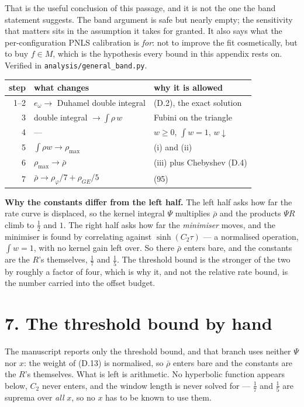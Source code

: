 \documentclass[11pt]{article}
\newcommand{\rmax}{\rho_{\max}}
\newcommand{\rbar}{\bar\rho}
\begin{document}
That is the useful conclusion of this passage, and it is not the one the
band statement suggests. The band argument is safe but nearly empty; the
sensitivity that matters sits in the assumption it takes for granted.
It also says what the per-configuration PNLS calibration is \emph{for}:
not to improve the fit cosmetically, but to buy $f \in M$, which is the
hypothesis every bound in this appendix rests on. Verified in
\texttt{analysis/general\_band.py}.

\begin{center}\small
\begin{tabular}{@{}rll@{}}
\toprule
step & what changes & why it is allowed \\
\midrule
1--2 & $e_\omega \to$ Duhamel double integral & (D.2), the exact solution \\
3 & double integral $\to \int\rho\,w$ & Fubini on the triangle \\
4 & --- & $w\ge0$, $\int w = 1$, $w\downarrow$ \\
5 & $\int\rho w \to \rmax$ & (i) and (ii) \\
6 & $\rmax \to \rbar$ & (iii) plus Chebyshev (D.4) \\
7 & $\rbar \to \rho_{\varphi}/7 + \rho_{GE}/5$ & (95) \\
\bottomrule
\end{tabular}
\end{center}


\textbf{Why the constants differ from the left half.} The left half
asks how far the rate curve is displaced, so the kernel integral
$\Psi$ multiplies $\rbar$ and the products $\Psi R$ climb to
$\tfrac12$ and $1$. The right half asks how far the \emph{minimiser}
moves, and the minimiser is found by correlating against
$\sinh(C_2\tau)$ --- a normalised operation, $\int w = 1$, with no
kernel gain left over. So there $\rbar$ enters bare, and the constants
are the $R$'s themselves, $\tfrac17$ and $\tfrac15$. The threshold
bound is the stronger of the two by roughly a factor of four, which is
why it, and not the relative rate bound, is the number carried into the
offset budget.

\section*{7. The threshold bound by hand}

The manuscript reports only the threshold bound, and that branch uses
neither $\Psi$ nor $x$: the weight of (D.13) is normalised, so $\rbar$
enters bare and the constants are the $R$'s themselves. What is left is
arithmetic. No hyperbolic function appears below, $C_2$ never enters,
and the window length is never solved for --- $\tfrac17$ and
$\tfrac15$ are suprema over \emph{all} $x$, so no $x$ has to be known
to use them.
\end{document}
